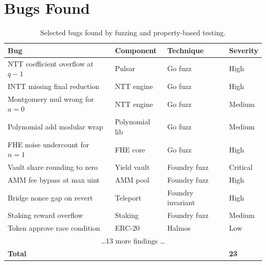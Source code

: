 \section{Bugs Found}


\begin{table}[H]
\centering
\small
\begin{tabular}{@{}llll@{}}
\toprule
\textbf{Bug} & \textbf{Component} & \textbf{Technique} & \textbf{Severity} \\
\midrule
NTT coefficient overflow at $q-1$ & Pulsar & Go fuzz & High \\
INTT missing final reduction & NTT engine & Go fuzz & High \\
Montgomery mul wrong for $a=0$ & NTT engine & Go fuzz & Medium \\
Polynomial add modular wrap & Polynomial lib & Go fuzz & Medium \\
FHE noise undercount for $n=1$ & FHE core & Go fuzz & High \\
Vault share rounding to zero & Yield vault & Foundry fuzz & Critical \\
AMM fee bypass at max uint & AMM pool & Foundry fuzz & High \\
Bridge nonce gap on revert & Teleport & Foundry invariant & High \\
Staking reward overflow & Staking & Foundry fuzz & Medium \\
Token approve race condition & ERC-20 & Halmos & Low \\
\multicolumn{4}{c}{\ldots 13 more findings \ldots} \\
\midrule
\textbf{Total} & & & \textbf{23} \\
\bottomrule
\end{tabular}
\caption{Selected bugs found by fuzzing and property-based testing.}
\end{table}

